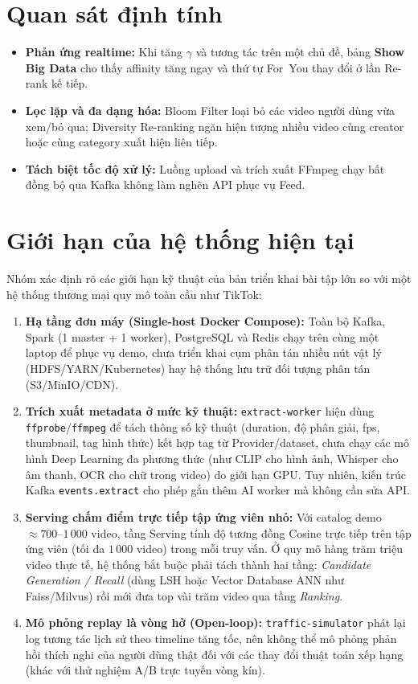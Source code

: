 \section{Quan sát định tính}

\begin{itemize}
  \item \textbf{Phản ứng realtime:} Khi tăng $\gamma$ và tương tác trên một chủ đề, bảng \textbf{Show Big Data} cho thấy affinity tăng ngay và thứ tự For~You thay đổi ở lần Re-rank kế tiếp.
  \item \textbf{Lọc lặp và đa dạng hóa:} Bloom Filter loại bỏ các video người dùng vừa xem/bỏ qua; Diversity Re-ranking ngăn hiện tượng nhiều video cùng creator hoặc cùng category xuất hiện liên tiếp.
  \item \textbf{Tách biệt tốc độ xử lý:} Luồng upload và trích xuất FFmpeg chạy bất đồng bộ qua Kafka không làm nghẽn API phục vụ Feed.
\end{itemize}

\section{Giới hạn của hệ thống hiện tại}

Nhóm xác định rõ các giới hạn kỹ thuật của bản triển khai bài tập lớn so với một hệ thống thương mại quy mô toàn cầu như TikTok:

\begin{enumerate}
  \item \textbf{Hạ tầng đơn máy (Single-host Docker Compose):} Toàn bộ Kafka, Spark (1 master + 1 worker), PostgreSQL và Redis chạy trên cùng một laptop để phục vụ demo, chưa triển khai cụm phân tán nhiều nút vật lý (HDFS/YARN/Kubernetes) hay hệ thống lưu trữ đối tượng phân tán (S3/MinIO/CDN).
  \item \textbf{Trích xuất metadata ở mức kỹ thuật:} \texttt{extract-worker} hiện dùng \texttt{ffprobe}/\texttt{ffmpeg} để tách thông số kỹ thuật (duration, độ phân giải, fps, thumbnail, tag hình thức) kết hợp tag từ Provider/dataset, chưa chạy các mô hình Deep Learning đa phương thức (như CLIP cho hình ảnh, Whisper cho âm thanh, OCR cho chữ trong video) do giới hạn GPU. Tuy nhiên, kiến trúc Kafka \texttt{events.extract} cho phép gắn thêm AI worker mà không cần sửa API.
  \item \textbf{Serving chấm điểm trực tiếp tập ứng viên nhỏ:} Với catalog demo $\approx 700$--$1\,000$ video, tầng Serving tính độ tương đồng Cosine trực tiếp trên tập ứng viên (tối đa $1\,000$ video) trong mỗi truy vấn. Ở quy mô hàng trăm triệu video thực tế, hệ thống bắt buộc phải tách thành hai tầng: \textit{Candidate Generation / Recall} (dùng LSH hoặc Vector Database ANN như Faiss/Milvus) rồi mới đưa top vài trăm video qua tầng \textit{Ranking}.
  \item \textbf{Mô phỏng replay là vòng hở (Open-loop):} \texttt{traffic-simulator} phát lại log tương tác lịch sử theo timeline tăng tốc, nên không thể mô phỏng phản hồi thích nghi của người dùng thật đối với các thay đổi thuật toán xếp hạng (khác với thử nghiệm A/B trực tuyến vòng kín).
\end{enumerate}
